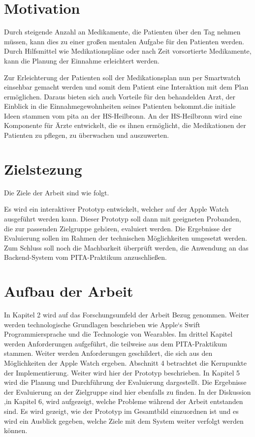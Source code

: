 \section{Motivation}
Durch steigende Anzahl an Medikamente, die Patienten über den Tag nehmen müssen, kann dies zu einer großen mentalen Aufgabe für den Patienten werden. Durch Hilfsmittel wie Medikationspläne oder nach Zeit vorsortierte Medikamente, kann die Planung der Einnahme erleichtert werden. 

Zur Erleichterung der Patienten soll der Medikationsplan nun per Smartwatch einsehbar gemacht werden und somit dem Patient eine Interaktion mit dem Plan ermöglichen. Daraus bieten sich auch Vorteile für den behandelden Arzt, der Einblick in die Einnahmegewohnheiten seines Patienten bekommt.die initiale Ideen stammen vom  \gls{pita} an der HS-Heilbronn. An der HS-Heilbronn wird eine Komponente für Ärzte entwickelt, die es ihnen ermöglicht, die Medikationen der Patienten zu pflegen, zu überwachen und auszuwerten.
\section{Zielstezung}
Die Ziele der Arbeit sind wie folgt.

Es wird ein interaktiver Prototyp entwickelt, welcher auf der Apple Watch ausgeführt werden kann. Dieser Prototyp soll dann mit geeigneten Probanden, die zur passenden Zielgruppe gehören, evaluiert werden.
Die Ergebnisse der Evaluierung sollen im Rahmen der technischen Möglichkeiten umgesetzt werden. Zum Schluss soll noch die Machbarkeit überprüft werden, die Anwendung an das Backend-System vom PITA-Praktikum anzuschließen.

\section{Aufbau der Arbeit}

In Kapitel 2 wird auf das Forschungsumfeld der Arbeit Bezug genommen. Weiter werden technologische Grundlagen beschrieben wie Apple`s Swift Programmiersprache und die Technologie von Wearables.
Im drittel Kapitel werden Anforderungen aufgeführt, die teilweise aus dem  PITA-Praktikum stammen. Weiter werden Anforderungen geschildert, die sich aus den Möglichkeiten der Apple Watch ergeben.
Abschnitt 4 betrachtet die Kernpunkte der Implementierung. Weiter wird hier der Prototyp beschrieben.
In Kapitel 5 wird die Planung und Durchführung der Evaluierung dargestellt. Die  Ergebnisse der Evaluierung an der Zielgruppe sind hier ebenfalls zu finden.
In der Diskussion ,in Kapitel 6, wird aufgezeigt, welche Probleme während der Arbeit entstanden sind. Es wird gezeigt, wie der Prototyp im Gesamtbild einzuordnen ist und es wird ein Ausblick gegeben, welche Ziele mit dem System weiter verfolgt werden können.

